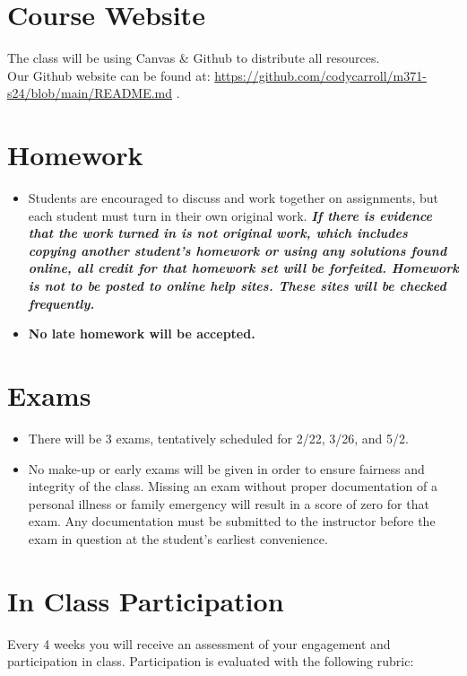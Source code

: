 \documentclass[10pt, oneside]{article}
\begin{document}
\section*{Course Website}
The class will be using Canvas \& Github to distribute all resources. \\Our Github website can be found at: \url{https://github.com/codycarroll/m371-s24/blob/main/README.md} .


\section*{Homework}
\begin{itemize}
	\item Students are encouraged to discuss and work together on assignments, but each student must turn in their own original work. \textit{ \textbf{If there is evidence that the work turned in is not original work, which includes copying another student's homework or using any solutions found online, all credit for that homework set will be forfeited.  Homework is not to be posted to online help sites.  These sites will be checked frequently. }} 
	\item \textbf{No late homework will be accepted.}
\end{itemize}
\section*{Exams}  
\begin{itemize}
	\item There will be 3 exams, tentatively scheduled for 2/22, 3/26, and 5/2.
	\item No make-up or early exams will be given in order to ensure fairness and integrity of the class.  Missing an exam without proper documentation of a personal illness or family emergency will result in a score of zero for that exam. Any documentation must be submitted to the instructor before the exam in question at the student's earliest convenience. 
\end{itemize}

\section*{In Class Participation}  
Every 4 weeks you will receive an assessment of your engagement and participation in class. Participation is evaluated with the following rubric: \\
\end{document}
